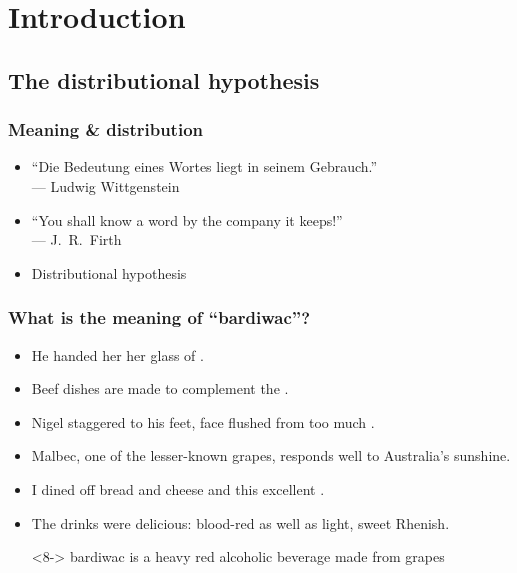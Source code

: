 \section{Introduction}

\subsection{The distributional hypothesis}

\begin{frame}[c]
  \frametitle{Meaning \& distribution}

  \begin{itemize}
  \item ``Die Bedeutung eines Wortes liegt in seinem Gebrauch.''\\
    \hfill --- Ludwig Wittgenstein
  \item[]\pause
  \item ``You shall know a word by the company it keeps!''\\
    \hfill --- J.~R.\ Firth
  \item[]\pause
  \item Distributional hypothesis 
  \end{itemize}
\end{frame}

\begin{frame}
  \frametitle{What is the meaning of ``\textbf{bardiwac}''?}

  \begin{itemize}
  \item<2-> He handed her her glass of .
  \item<3-> Beef dishes are made to complement the .
  \item<4-> Nigel staggered to his feet, face flushed from too much .
  \item<5-> Malbec, one of the lesser-known  grapes, responds well to Australia's sunshine.
  \item<6-> I dined off bread and cheese and this excellent .
  \item<7-> The drinks were delicious: blood-red  as well as light, sweet Rhenish.
  \item[\hand]<8-> bardiwac is a heavy red alcoholic beverage made from grapes
  \end{itemize}
\end{frame}

